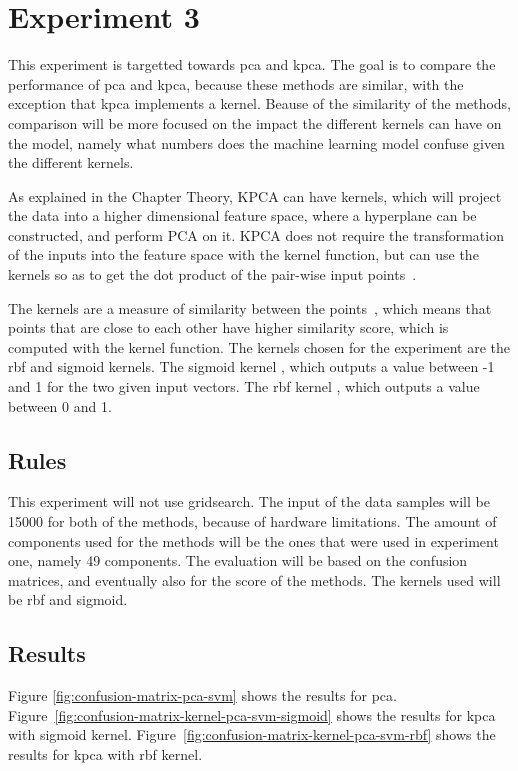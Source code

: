 \section{Experiment 3}\label{sec:experiment-3}
This experiment is targetted towards \gls{pca} and \gls{kpca}. The goal is to compare the performance of \gls{pca} and \gls{kpca}, because these methods are similar, with the exception that \gls{kpca} implements a kernel. Beause of the similarity of the methods, comparison will be more focused on the impact the different kernels can have on the model, namely what numbers does the machine learning model confuse given the different kernels.


As explained in the Chapter Theory, KPCA can have kernels, which will project the data into a higher dimensional feature space, where a hyperplane can be constructed, and perform PCA on it. KPCA does not require the transformation of the inputs into the feature space with the kernel function, but can use the kernels so as to get the dot product of the pair-wise input points~\cite{kpca-book}.


The kernels are a measure of similarity between the points~\cite{scikit-learn}, which means that points that are close to each other have higher similarity score, which is computed with the kernel function. The kernels chosen for the experiment are the \gls{rbf} and sigmoid kernels. The sigmoid kernel , which outputs a value between -1 and 1 for the two given input vectors. The \gls{rbf} kernel , which outputs a value between 0 and 1.


\subsection{Rules}
This experiment will not use gridsearch. The input of the data samples will be 15000 for both of the methods, because of hardware limitations. The amount of components used for the methods will be the ones that were used in experiment one, namely 49 components. The evaluation will be based on the confusion matrices, and eventually also for the score of the methods. The kernels used will be \gls{rbf} and sigmoid.


\subsection{Results}
Figure \ref{fig:confusion-matrix-pca-svm} shows the results for \gls{pca}.
Figure~\ref{fig:confusion-matrix-kernel-pca-svm-sigmoid} shows the results for \gls{kpca} with sigmoid kernel.
Figure~\ref{fig:confusion-matrix-kernel-pca-svm-rbf} shows the results for \gls{kpca} with rbf kernel.


